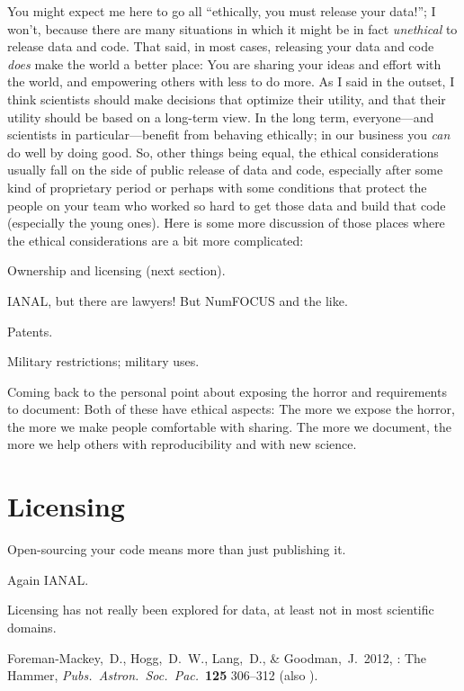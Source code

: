 \documentclass[12pt,twoside,pdftex]{article}
\begin{document}
You might expect me here to go all ``ethically, you must release your
data!''; I won't, because there are many situations in which it might
be in fact \emph{unethical} to release data and code.
That said, in most cases, releasing your data and code \emph{does}
make the world a better place: You are sharing your ideas and effort
with the world, and empowering others with less to do more.
As I said in the outset, I think scientists should make decisions that
optimize their utility, and that their utility should be based on a
long-term view.
In the long term, everyone---and scientists in particular---benefit
from behaving ethically; in our business you \emph{can} do well by
doing good.
So, other things being equal, the ethical considerations usually fall
on the side of public release of data and code, especially after some
kind of proprietary period or perhaps with some conditions that
protect the people on your team who worked so hard to get those data
and build that code (especially the young ones).
Here is some more discussion of those places where the ethical
considerations are a bit more complicated:

Ownership and licensing (next section).

IANAL, but there are lawyers! But NumFOCUS and the like.

Patents.

Military restrictions; military uses.

Coming back to the personal point about exposing the horror and
requirements to document: Both of these have ethical aspects: The more
we expose the horror, the more we make people comfortable with
sharing. The more we document, the more we help others with
reproducibility and with new science.

\section{Licensing}

Open-sourcing your code means more than just publishing it.

Again IANAL.

Licensing has not really been explored for data, at least not in most
scientific domains.

\clearpage
{}\theendnotes

\clearpage
\raggedright
\begin{thebibliography}{}
  Foreman-Mackey,~D., Hogg,~D.~W., Lang,~D., \& Goodman,~J.\ 2012,
  : The  Hammer,
  \textit{Pubs.\ Astron.\ Soc.\ Pac.}\ \textbf{125} 306--312
  (also ).
\end{thebibliography}
\end{document}
